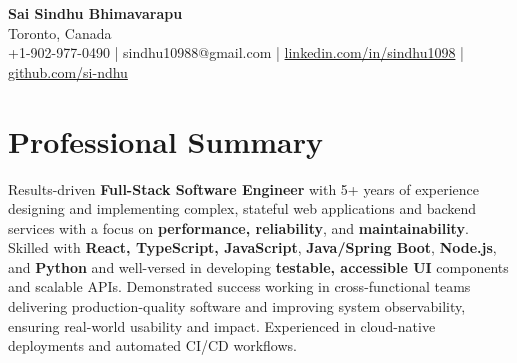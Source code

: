 \documentclass[letterpaper,11pt]{article}
\begin{document}
\begin{center}
  {\Large \textbf{Sai Sindhu Bhimavarapu}} \\
  Toronto, Canada \\
  +1-902-977-0490 \enspace | \enspace sindhu10988@gmail.com \enspace | \enspace \href{https://www.linkedin.com/in/sindhu1098/}{linkedin.com/in/sindhu1098} \enspace | \enspace \href{https://github.com/si-ndhu}{github.com/si-ndhu}
\end{center}

\section{Professional Summary}
  \begin{itemize}[leftmargin=0.15in, label={}]
    \small{\item{
     Results-driven \textbf{Full-Stack Software Engineer} with 5+ years of experience designing and implementing complex, stateful web applications and backend services with a focus on \textbf{performance, reliability}, and \textbf{maintainability}. Skilled with \textbf{React, TypeScript, JavaScript}, \textbf{Java/Spring Boot}, \textbf{Node.js}, and \textbf{Python} and well-versed in developing \textbf{testable, accessible UI} components and scalable APIs. Demonstrated success working in cross-functional teams delivering production-quality software and improving system observability, ensuring real-world usability and impact. Experienced in cloud-native deployments and automated CI/CD workflows.
    }}
  \end{itemize}
\vspace{-16pt}

\end{document}
